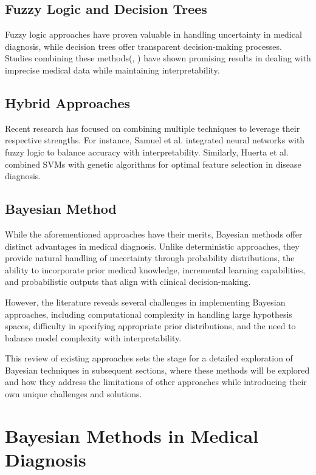 \documentclass[3p,times,procedia]{elsarticle}
\begin{document}
\subsection{Fuzzy Logic and Decision Trees}
Fuzzy logic approaches have proven valuable in handling
uncertainty in medical diagnosis, while decision trees
offer transparent decision-making processes. Studies 
combining these methods(\cite{FAN2011632},
\cite{Barach2019Fuzzy}) have shown
promising results in dealing with imprecise medical data
while maintaining interpretability.

\subsection{Hybrid Approaches}
Recent research has focused on combining multiple techniques 
to leverage their respective strengths.
For instance, Samuel et al. \cite{SAMUEL2017163} integrated neural networks 
with fuzzy logic to balance accuracy with interpretability.
Similarly, Huerta et al. \cite{Huerta2006} combined SVMs with genetic
algorithms for optimal feature selection in disease diagnosis.

\subsection{Bayesian Method}
While the aforementioned approaches have their merits,
Bayesian methods offer distinct advantages in medical 
diagnosis. Unlike deterministic approaches, they provide
natural handling of uncertainty through probability
distributions, the ability to incorporate prior medical
knowledge, incremental learning capabilities, and
probabilistic outputs that align with clinical decision-making. 

However, the literature reveals several challenges in
implementing Bayesian approaches, including computational
complexity in handling large hypothesis spaces, difficulty
in specifying appropriate prior distributions, and the need
to balance model complexity with interpretability. 

This review of existing approaches sets the stage for a
detailed exploration of Bayesian techniques in subsequent
sections, where these methods will be explored and how they address
the limitations of other approaches while introducing their
own unique challenges and solutions.

\section{Bayesian Methods in Medical Diagnosis}
\end{document}
